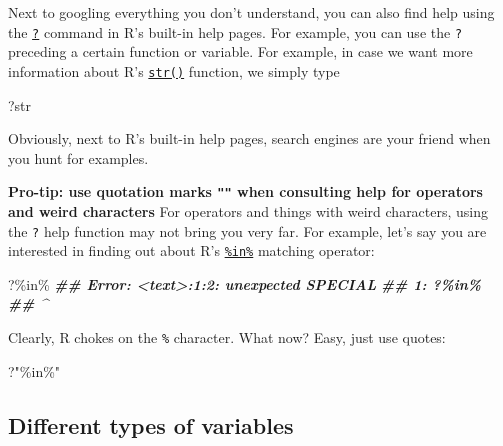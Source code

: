 \documentclass[
]{book}
\newenvironment{Shaded}{\begin{snugshade}}{\end{snugshade}}
\newcommand{\DocumentationTok}[1]{\textcolor[rgb]{0.56,0.35,0.01}{\textbf{\textit{#1}}}}
\newcommand{\NormalTok}[1]{#1}
\newcommand{\SpecialCharTok}[1]{\textcolor[rgb]{0.00,0.00,0.00}{#1}}
\newcommand{\StringTok}[1]{\textcolor[rgb]{0.31,0.60,0.02}{#1}}
\begin{document}
Next to googling everything you don't understand, you can also find help using the \href{https://stat.ethz.ch/R-manual/R-devel/library/utils/html/Question.html}{\texttt{?}} command in R's built-in help pages. For example, you can use the \texttt{?} preceding a certain function or variable. For example, in case we want more information about R's \href{https://stat.ethz.ch/R-manual/R-devel/library/utils/html/str.html}{\texttt{str()}} function, we simply type

\begin{Shaded}
\begin{Highlighting}[]
\NormalTok{?str}
\end{Highlighting}
\end{Shaded}

Obviously, next to R's built-in help pages, search engines are your friend when you hunt for examples.

\textbf{Pro-tip: use quotation marks \texttt{""} when consulting help for operators and weird characters} For operators and things with weird characters, using the \texttt{?} help function may not bring you very far. For example, let's say you are interested in finding out about R's \href{https://stat.ethz.ch/R-manual/R-devel/library/base/html/match.html}{\texttt{\%in\%}} matching operator:

\begin{Shaded}
\begin{Highlighting}[]
\NormalTok{?}\SpecialCharTok{\%in\%}
\DocumentationTok{\#\# Error: \textless{}text\textgreater{}:1:2: unexpected SPECIAL}
\DocumentationTok{\#\# 1: ?\%in\%}
\DocumentationTok{\#\#      \^{}}
\end{Highlighting}
\end{Shaded}

Clearly, R chokes on the \texttt{\%} character. What now? Easy, just use quotes:

\begin{Shaded}
\begin{Highlighting}[]
\NormalTok{?}\StringTok{"\%in\%"}
\end{Highlighting}
\end{Shaded}

\hypertarget{different-types-of-variables}{%
\subsection{Different types of variables}\label{different-types-of-variables}}
\end{document}
